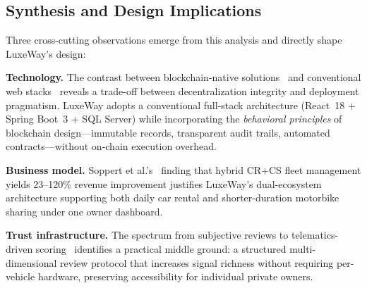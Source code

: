 \subsection{Synthesis and Design Implications}

Three cross-cutting observations emerge from this analysis and directly
shape LuxeWay's design:

\textbf{Technology.} The contrast between blockchain-native
solutions~\cite{madhusudan2019applying, elhog2025decentralized} and
conventional web stacks~\cite{gupta2025double} reveals a trade-off
between decentralization integrity and deployment pragmatism. LuxeWay
adopts a conventional full-stack architecture (React~18 + Spring
Boot~3 + SQL Server) while incorporating the \textit{behavioral
principles} of blockchain design---immutable records, transparent audit
trails, automated contracts---without on-chain execution overhead.

\textbf{Business model.} Soppert et al.'s~\cite{soppert2024benefit}
finding that hybrid CR+CS fleet management yields 23--120\% revenue
improvement justifies LuxeWay's dual-ecosystem architecture supporting
both daily car rental and shorter-duration motorbike sharing under one
owner dashboard.

\textbf{Trust infrastructure.} The spectrum from subjective reviews to
telematics-driven scoring~\cite{neifer2024trust} identifies a practical
middle ground: a structured multi-dimensional review protocol that
increases signal richness without requiring per-vehicle hardware,
preserving accessibility for individual private owners.
